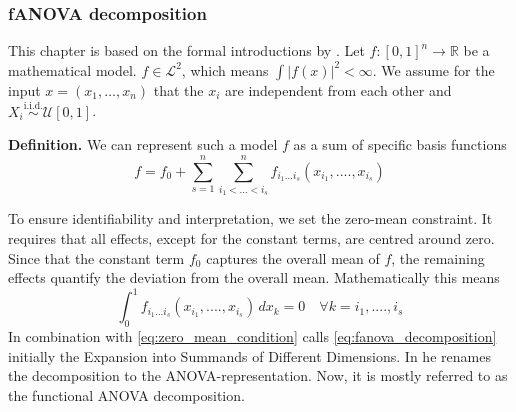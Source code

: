 \subsubsection*{fANOVA decomposition}
This chapter is based on the formal introductions by \cite{hoeffding_class_1948, sobol1993sensitivity, sobol_global_2001, hooker_discovering_2004}.
Let $f: [0,1]^n \rightarrow \mathbb{R}$  be a mathematical model. $f \in \mathcal{L}^2$, which means $\int|f(x)|^2 < \infty$. We assume for the input $x = (x_1,\dots, x_n)$ that the $x_i$ are independent from each other and $X_i \overset{\text{i.i.d.}}{\sim} \mathcal{U}[0, 1]$.\par

\textbf{Definition.} We can represent such a model $f$ as a sum of specific basis functions
\begin{equation}
    f = f_0 + \sum_{s=1}^{n} \sum_{i_1 <...<i_s}^{n} f_{i_{1}...i_{s}} (x_{i_{1}} , ....,x_{i_{s}})
    \label{eq:fanova_decomposition}
\end{equation}

To ensure identifiability and interpretation, we set the zero-mean constraint. It requires that all effects, except for the constant terms, are centred around zero. Since that the constant term $f_0$ captures the overall mean of $f$, the remaining effects quantify the deviation from the overall mean. Mathematically this means
\begin{equation}
    \int_{0}^{1} f_{i_{1}...i_{s}} (x_{i_{1}}, ...., x_{i_{s}}) \, dx_k = 0 \quad \forall k = i_1, ...., i_s
    \label{eq:zero_mean_condition}
\end{equation}
In combination with \autoref{eq:zero_mean_condition}  \cite{sobol1993sensitivity} calls \autoref{eq:fanova_decomposition} initially the \ldq Expansion into Summands of Different Dimensions\rdq. In \cite{sobol_global_2001} he renames the decomposition to the \ldq ANOVA-representation\rdq. Now, it is mostly referred to as the \ldq functional ANOVA decomposition\rdq \citep{hooker_discovering_2004}.\par

